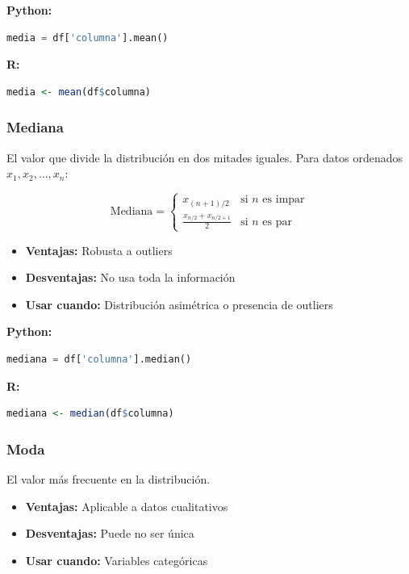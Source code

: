 \documentclass[a4paper,11pt]{article}
\begin{document}
\textbf{Python:}
\begin{lstlisting}[language=Python]
media = df['columna'].mean()
\end{lstlisting}

\textbf{R:}
\begin{lstlisting}[language=R]
media <- mean(df$columna)
\end{lstlisting}

\subsubsection{Mediana}

El valor que divide la distribución en dos mitades iguales. Para datos ordenados $x_1, x_2, \ldots, x_n$:

$$\text{Mediana} = \begin{cases}
x_{(n+1)/2} & \text{si } n \text{ es impar}\\
\frac{x_{n/2} + x_{n/2+1}}{2} & \text{si } n \text{ es par}
\end{cases}$$

\begin{itemize}
    \item \textbf{Ventajas:} Robusta a outliers
    \item \textbf{Desventajas:} No usa toda la información
    \item \textbf{Usar cuando:} Distribución asimétrica o presencia de outliers
\end{itemize}

\textbf{Python:}
\begin{lstlisting}[language=Python]
mediana = df['columna'].median()
\end{lstlisting}

\textbf{R:}
\begin{lstlisting}[language=R]
mediana <- median(df$columna)
\end{lstlisting}

\subsubsection{Moda}

El valor más frecuente en la distribución.

\begin{itemize}
    \item \textbf{Ventajas:} Aplicable a datos cualitativos
    \item \textbf{Desventajas:} Puede no ser única
    \item \textbf{Usar cuando:} Variables categóricas
\end{itemize}
\end{document}
